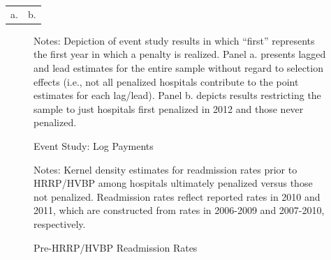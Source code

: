 \documentclass[12pt]{article}
\begin{document}
{\begin{tabular}{cc}
a.																	& b. \\
\end{tabular}
}
\setlength{\captionmargin}{.5 \textwidth} \addtolength{\captionmargin}{-.5\wd\gfxbox}
\begin{figure}[htbp!]
\centering
\caption{Event Study: Log Payments}
\label{fig:event}
\usebox{\gfxbox}
\par
\begin{minipage}{\wd\gfxbox}
\footnotesize
Notes:  Depiction of event study results in which ``first'' represents the first year in which a penalty is realized. Panel a. presents lagged and lead estimates for the entire sample without regard to selection effects (i.e., not all penalized hospitals contribute to the point estimates for each lag/lead).  Panel b. depicts results restricting the sample to just hospitals first penalized in 2012 and those never penalized.
\end{minipage}
\end{figure}

\newpage
{}
\setlength{\captionmargin}{.5 \textwidth} \addtolength{\captionmargin}{-.5\wd\gfxbox}
\begin{figure}[htbp!]
\centering
\caption{Pre-HRRP/HVBP Readmission Rates}
\label{fig:pre_readmits}
\usebox{\gfxbox}
\par
\begin{minipage}{\wd\gfxbox}
\footnotesize
Notes:  Kernel density estimates for readmission rates prior to HRRP/HVBP among hospitals ultimately penalized versus those not penalized. Readmission rates reflect reported rates in 2010 and 2011, which are constructed from rates in 2006-2009 and 2007-2010, respectively.
\end{minipage}
\end{figure}
\newpage
\end{document}
